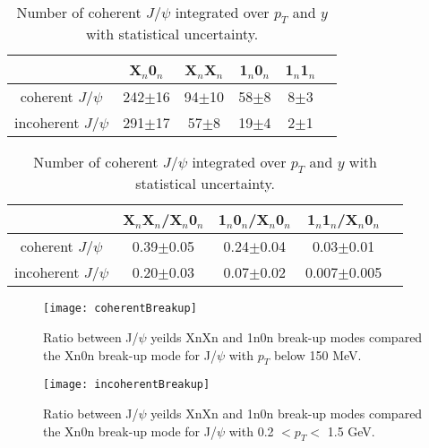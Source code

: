     \begin{table}[h]
    \begin{center}
    \caption{Number of coherent $J/\psi$ integrated over $p_{T}$ and $y$ with statistical uncertainty.}
    \label{tab:r1}
    \begin{tabular}{|c|c|c|c|c|c|}
    \hline
                                   &  X$_{n}$0$_{n}$& X$_{n}$X$_{n}$ & 1$_{n}$0$_{n}$ & 1$_{n}$1$_{n}$  \\ 
    \hline
    coherent $J/\psi$ &  242$\pm$16&94$\pm$10&58$\pm$8&8$\pm$3\\
    \hline
     incoherent $J/\psi$ & 291$\pm$17&57$\pm$8&19$\pm$4&2$\pm$1  \\
    \hline
    \end{tabular}
    \end{center}
    
    \end{table}
    
    
    \begin{table}[h]
    \begin{center}
    
    \caption{Number of coherent $J/\psi$ integrated over $p_{T}$ and $y$ with statistical uncertainty.}
    \label{tab:r2}
    \begin{tabular}{|c|c|c|c|c|}
    \hline
                                     & X$_{n}$X$_{n}$/X$_{n}$0$_{n}$ & 1$_{n}$0$_{n}$/X$_{n}$0$_{n}$ & 1$_{n}$1$_{n}$/X$_{n}$0$_{n}$  \\ 
    \hline
    coherent $J/\psi$ &  0.39$\pm$0.05&0.24$\pm$0.04&0.03$\pm$0.01\\
    \hline
     incoherent $J/\psi$ &  0.20$\pm$0.03&0.07$\pm$0.02&0.007$\pm$0.005 \\
    \hline
    \end{tabular}
    \end{center}
    
    \end{table}
      \begin{figure}[!Hhtb]
        \centering
        \texttt{[image: coherentBreakup]}
        \caption{Ratio between J/$\psi$ yeilds XnXn and 1n0n break-up modes 
          compared the Xn0n break-up mode for J/$\psi$ with $p_{T}$ below 150 
          MeV.}
        \label{fig:coherentBreakUp}
      \end{figure}
    
       \begin{figure}[!Hhtb]
        \centering
        \texttt{[image: incoherentBreakup]}
        \caption{Ratio between J/$\psi$ yeilds XnXn and 1n0n break-up modes 
          compared the Xn0n break-up mode for J/$\psi$ with 0.2 $< p_{T} <$ 
          1.5 GeV.}
        \label{fig:incoherentBreakUp}
      \end{figure}

